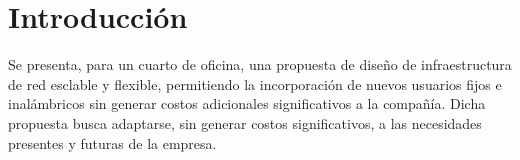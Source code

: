 \section{Introducción}

Se presenta, para un cuarto de oficina, una propuesta  de diseño de
infraestructura de red esclable y flexible, permitiendo la 
incorporación de nuevos usuarios fijos e inalámbricos sin generar costos
adicionales significativos a la compañía. Dicha propuesta busca 
adaptarse, sin generar costos significativos, a las necesidades 
presentes y futuras de la empresa.
